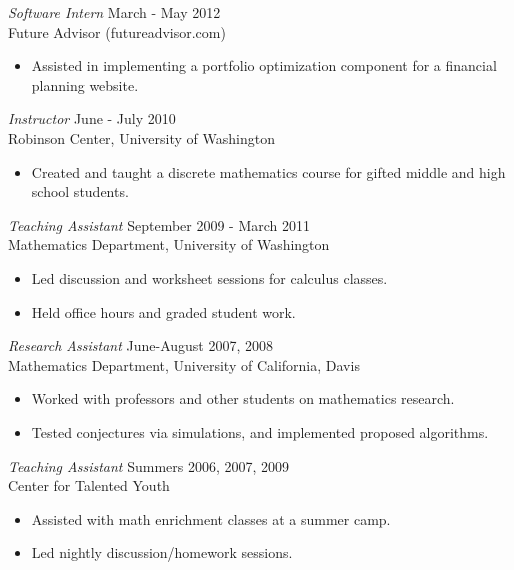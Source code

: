 \documentclass{res}
\begin{document}
\begin{resume}
                {\sl Software Intern} \hfill            March - May 2012\\
                Future Advisor (futureadvisor.com)
                 \begin{itemize}  \itemsep -2pt %
                 \item Assisted in implementing a portfolio optimization component for a financial planning website.
                 \end{itemize} 
                {\sl Instructor} \hfill            June - July 2010\\
                Robinson Center, University of Washington
                 \begin{itemize}  \itemsep -2pt %
                 \item Created and taught a discrete mathematics course for gifted middle and high school students.
                 \end{itemize} 
                {\sl Teaching Assistant} \hfill            September 2009 - March 2011\\
                Mathematics Department, University of Washington
                 \begin{itemize}  \itemsep -2pt %
                 \item Led discussion and worksheet sessions for calculus classes.
		\item Held office hours and graded student work.
		\end{itemize}
                {\sl Research Assistant} \hfill            June-August 2007, 2008\\
                Mathematics Department, University of California, Davis
                 \begin{itemize}  \itemsep -2pt %
                 \item Worked with professors and other students on mathematics research.
		\item Tested conjectures via simulations, and implemented proposed algorithms.
                 \end{itemize} 
                {\sl Teaching Assistant} \hfill            Summers 2006, 2007, 2009\\
                Center for Talented Youth
                 \begin{itemize}  \itemsep -2pt %
                 \item Assisted with math enrichment classes at a summer camp.
		\item Led nightly discussion/homework sessions.
                 \end{itemize} 



\end{resume}
\end{document}
